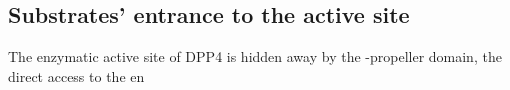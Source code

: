 \subsection{Substrates' entrance to the active site}

The enzymatic active site of DPP4 is hidden away by the \beta-propeller domain, the direct access to the en
